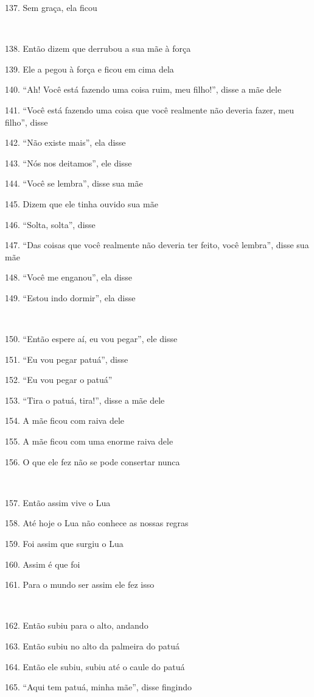 137. Sem graça, ela ficou

~

138. Então dizem que derrubou a sua mãe à força

139. Ele a pegou à força e ficou em cima dela

140. ``Ah! Você está fazendo uma coisa ruim, meu filho!'', disse a mãe
dele

141. ``Você está fazendo uma coisa que você realmente não deveria fazer,
meu filho'', disse

142. ``Não existe mais'', ela disse

143. ``Nós nos deitamos'', ele disse

144. ``Você se lembra'', disse sua mãe

145. Dizem que ele tinha ouvido sua mãe

146. ``Solta, solta'', disse

147. ``Das coisas que você realmente não deveria ter feito, você
lembra'', disse sua mãe

148. ``Você me enganou'', ela disse

149. ``Estou indo dormir'', ela disse

~

150. ``Então espere aí, eu vou pegar'', ele disse

151. ``Eu vou pegar patuá'', disse

152. ``Eu vou pegar o patuá''

153. ``Tira o patuá, tira!'', disse a mãe dele

154. A mãe ficou com raiva dele

155. A mãe ficou com uma enorme raiva dele

156. O que ele fez não se pode consertar nunca

~

157. Então assim vive o Lua

158. Até hoje o Lua não conhece as nossas regras

159. Foi assim que surgiu o Lua

160. Assim é que foi

161. Para o mundo ser assim ele fez isso

~

162. Então subiu para o alto, andando

163. Então subiu no alto da palmeira do patuá

164. Então ele subiu, subiu até o caule do patuá

165. ``Aqui tem patuá, minha mãe'', disse fingindo

